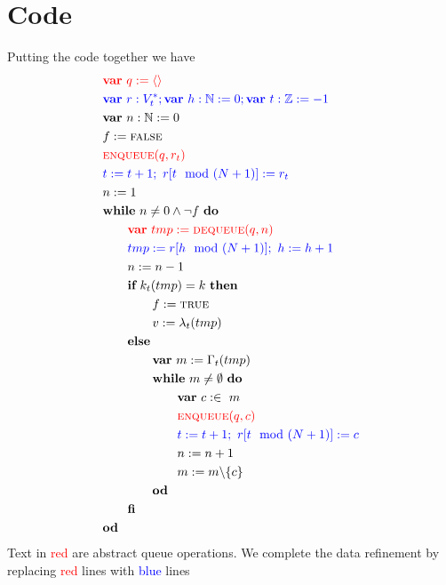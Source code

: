 \documentclass[headings=small,a4paper,12pt]{scrartcl}
\newcommand{\enq}{\textsc{enqueue}\xspace}
\newcommand{\deq}{\textsc{dequeue}\xspace}
\begin{document}
\section{Code}
\label{sec:code}
Putting the code together we have
\begin{align}
    &\textcolor{red}{\VAR~q\Ass\langle\rangle}\\
    &\textcolor{blue}{\VAR~r:V^*_t; \VAR~h:\mathbb{N}\Ass 0; \VAR~t:\mathbb{Z}\Ass -1}\\
    &\VAR~n:\mathbb{N}\Ass 0\\
    &f\Ass \False\\
    &\textcolor{red}{\enq(q,r_t)}\\
    &\textcolor{blue}{t\Ass t+1;~r[t \mod (N+1)]\Ass r_t}\\
    &n\Ass 1\\
    &\WHILE~n \ne 0\And \Not f~\DO\\
    &\textcolor{red}{\qquad \VAR~tmp\Ass \deq(q,n)}\\
    &\qquad\textcolor{blue}{tmp\Ass r[h \mod (N+1)];~h\Ass h+1}\\
    &\qquad n\Ass n-1\\
    &\qquad \IF~k_t(tmp) = k~\THEN\\
    &\qquad\qquad f\Ass \True\\
    &\qquad\qquad v\Ass \lambda_t(tmp)\\
    &\qquad \ELSE\\
    &\qquad\qquad \VAR~m\Ass \Gamma_t(tmp)\\
    &\qquad\qquad\WHILE~m \ne \emptyset~\DO\\
    &\qquad\qquad\qquad\VAR~c:\in~m\\
    &\textcolor{red}{\qquad\qquad\qquad\enq(q,c)}\\
    &\qquad\qquad\qquad\textcolor{blue}{t\Ass t+1;~r[t \mod (N+1)]\Ass c}\\
    &\qquad\qquad\qquad n \Ass n+1\\
    &\qquad\qquad\qquad m\Ass m\backslash\{c\}\\
    &\qquad\qquad\OD\\
    &\qquad\FI\\
    &\OD
\end{align}
Text in \textcolor{red}{red} are abstract queue operations. We complete the data refinement by replacing \textcolor{red}{red} lines with \textcolor{blue}{blue} lines\\
\end{document}
